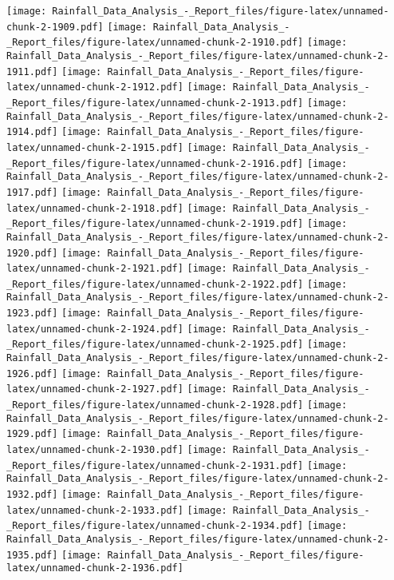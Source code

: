 \documentclass[
]{article}
\begin{document}
\texttt{[image: Rainfall\_Data\_Analysis\_-\_Report\_files/figure-latex/unnamed-chunk-2-1909.pdf]}
\texttt{[image: Rainfall\_Data\_Analysis\_-\_Report\_files/figure-latex/unnamed-chunk-2-1910.pdf]}
\texttt{[image: Rainfall\_Data\_Analysis\_-\_Report\_files/figure-latex/unnamed-chunk-2-1911.pdf]}
\texttt{[image: Rainfall\_Data\_Analysis\_-\_Report\_files/figure-latex/unnamed-chunk-2-1912.pdf]}
\texttt{[image: Rainfall\_Data\_Analysis\_-\_Report\_files/figure-latex/unnamed-chunk-2-1913.pdf]}
\texttt{[image: Rainfall\_Data\_Analysis\_-\_Report\_files/figure-latex/unnamed-chunk-2-1914.pdf]}
\texttt{[image: Rainfall\_Data\_Analysis\_-\_Report\_files/figure-latex/unnamed-chunk-2-1915.pdf]}
\texttt{[image: Rainfall\_Data\_Analysis\_-\_Report\_files/figure-latex/unnamed-chunk-2-1916.pdf]}
\texttt{[image: Rainfall\_Data\_Analysis\_-\_Report\_files/figure-latex/unnamed-chunk-2-1917.pdf]}
\texttt{[image: Rainfall\_Data\_Analysis\_-\_Report\_files/figure-latex/unnamed-chunk-2-1918.pdf]}
\texttt{[image: Rainfall\_Data\_Analysis\_-\_Report\_files/figure-latex/unnamed-chunk-2-1919.pdf]}
\texttt{[image: Rainfall\_Data\_Analysis\_-\_Report\_files/figure-latex/unnamed-chunk-2-1920.pdf]}
\texttt{[image: Rainfall\_Data\_Analysis\_-\_Report\_files/figure-latex/unnamed-chunk-2-1921.pdf]}
\texttt{[image: Rainfall\_Data\_Analysis\_-\_Report\_files/figure-latex/unnamed-chunk-2-1922.pdf]}
\texttt{[image: Rainfall\_Data\_Analysis\_-\_Report\_files/figure-latex/unnamed-chunk-2-1923.pdf]}
\texttt{[image: Rainfall\_Data\_Analysis\_-\_Report\_files/figure-latex/unnamed-chunk-2-1924.pdf]}
\texttt{[image: Rainfall\_Data\_Analysis\_-\_Report\_files/figure-latex/unnamed-chunk-2-1925.pdf]}
\texttt{[image: Rainfall\_Data\_Analysis\_-\_Report\_files/figure-latex/unnamed-chunk-2-1926.pdf]}
\texttt{[image: Rainfall\_Data\_Analysis\_-\_Report\_files/figure-latex/unnamed-chunk-2-1927.pdf]}
\texttt{[image: Rainfall\_Data\_Analysis\_-\_Report\_files/figure-latex/unnamed-chunk-2-1928.pdf]}
\texttt{[image: Rainfall\_Data\_Analysis\_-\_Report\_files/figure-latex/unnamed-chunk-2-1929.pdf]}
\texttt{[image: Rainfall\_Data\_Analysis\_-\_Report\_files/figure-latex/unnamed-chunk-2-1930.pdf]}
\texttt{[image: Rainfall\_Data\_Analysis\_-\_Report\_files/figure-latex/unnamed-chunk-2-1931.pdf]}
\texttt{[image: Rainfall\_Data\_Analysis\_-\_Report\_files/figure-latex/unnamed-chunk-2-1932.pdf]}
\texttt{[image: Rainfall\_Data\_Analysis\_-\_Report\_files/figure-latex/unnamed-chunk-2-1933.pdf]}
\texttt{[image: Rainfall\_Data\_Analysis\_-\_Report\_files/figure-latex/unnamed-chunk-2-1934.pdf]}
\texttt{[image: Rainfall\_Data\_Analysis\_-\_Report\_files/figure-latex/unnamed-chunk-2-1935.pdf]}
\texttt{[image: Rainfall\_Data\_Analysis\_-\_Report\_files/figure-latex/unnamed-chunk-2-1936.pdf]}
\end{document}
